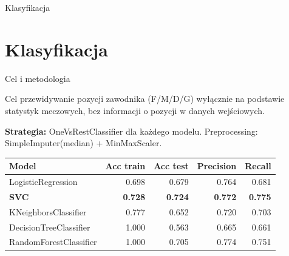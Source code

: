 \documentclass[aspectratio=169]{beamer}
\begin{document}

\begin{frame}[c]
    \centering
    \vfill
    { Klasyfikacja}
    \vfill
\end{frame}

\section{Klasyfikacja}

\begin{frame}{Cel i metodologia}
    \begin{block}{Cel}
        przewidywanie pozycji zawodnika (F/M/D/G) wyłącznie na podstawie statystyk meczowych, bez informacji o pozycji w danych wejściowych.
    \end{block}

    \vspace{0.3cm}
    \textbf{Strategia:} OneVsRestClassifier dla każdego modelu. Preprocessing: SimpleImputer(median) + MinMaxScaler.

    \vspace{0.3cm}
    \begin{tabular}{lrrrr}
        \toprule
        \textbf{Model} & \textbf{Acc train} & \textbf{Acc test} & \textbf{Precision} & \textbf{Recall} \\
        \midrule
        LogisticRegression     & 0.698 & 0.679 & 0.764 & 0.681 \\
        \textbf{SVC}           & \textbf{0.728} & \textbf{0.724} & \textbf{0.772} & \textbf{0.775} \\
        KNeighborsClassifier   & 0.777 & 0.652 & 0.720 & 0.703 \\
        DecisionTreeClassifier & 1.000 & 0.563 & 0.665 & 0.661 \\
        RandomForestClassifier & 1.000 & 0.705 & 0.774 & 0.751 \\
        \bottomrule
    \end{tabular}
\end{frame}
\end{document}
